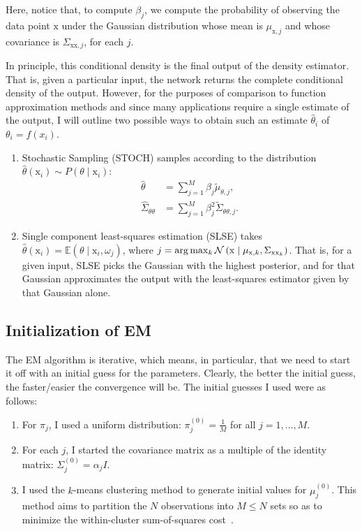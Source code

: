 %
Here, notice that, to compute $\beta_j$, we compute the probability of observing
the data point $\mathrm{x}$ under the Gaussian distribution whose mean is
$\mu_{\mathrm{x},j}$ and whose covariance is $\Sigma_{\mathrm{xx},j}$, for each
$j$.


In principle, this conditional density is the final output of the density
estimator. That is, given a particular input, the network returns the complete
conditional density of the output. However, for the purposes of comparison to
function approximation methods and since many applications require a single
estimate of the output, I will outline two possible ways to obtain such an
estimate $\hat{\theta}_i$ of $\theta_i = f(x_i)$.

\begin{enumerate}
    \item Stochastic Sampling (STOCH) samples according to the distribution
    $\hat{\theta}(\mathrm{x}_i) \sim P(\theta \mid \mathrm{x}_i)$:
    \begin{align*}
        \hat{\theta} &= \sum_{j=1}^M \beta_j \tilde{\mu}_{\theta,j}, \\
        \hat{\Sigma}_{\theta\theta} &= \sum_{j=1}^M \beta_j^2 \tilde{\Sigma}_{\theta\theta,j}.
    \end{align*}
    \item Single component least-squares estimation (SLSE) takes
    $\hat{\theta}(\mathrm{x}_i) = \mathbb{E}\left( \theta \mid \mathrm{x}_i,
    \omega_j \right)$, where $j = \arg \max_k \mathcal{N}\left(\mathrm{x} \mid
    \mu_{\mathrm{x},k}, \Sigma_{\mathrm{xx}_k}\right)$. That is, for a given input,
    SLSE picks the Gaussian with the highest posterior, and for that Gaussian
    approximates the output with the least-squares estimator given by that
    Gaussian alone.
\end{enumerate}


\subsection{Initialization of EM}
%
The EM algorithm is iterative, which means, in particular, that we need to start
it off with an initial guess for the parameters. Clearly, the better the initial
guess, the faster/easier the convergence will be. The initial guesses I used
were as follows:

\begin{enumerate}
    \item For $\pi_j$, I used a uniform distribution: $\pi_j^{(0)} =
    \frac{1}{M}$ for all $j = 1, \ldots, M$.
    \item For each $j$, I started the covariance matrix as a multiple of the
    identity matrix: $\Sigma_j^{(0)} = \alpha_j I$.
    \item I used the $k$-means clustering method to generate initial values for
    $\mu_j^{(0)}$. This method aims to partition the $N$ observations into $M
    \leq N$ sets so as to minimize the within-cluster sum-of-squares
    cost~\cite{wiki:K-means_clustering}.
\end{enumerate}


